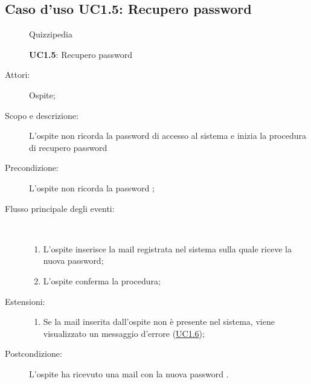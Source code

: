 \subsection{Caso d'uso UC1.5: Recupero password}
\begin{figure}[H]
	\centering
	\begin{resizedtikzpicture}{\textwidth}
		\begin{umlsystem}[x=0, fill=lightgray!20]{Quizzipedia}
		\end{umlsystem}
	\end{resizedtikzpicture}
	\caption{\textbf{UC1.5}: Recupero password}
	\label{UC1.5}
\end{figure}
\begin{description}
	\item[Attori:] Ospite;
	\item[Scopo e descrizione:] L'ospite non ricorda la password di accesso al sistema e inizia la procedura di recupero password
	\item[Precondizione:] L'ospite non ricorda la password
	;
	
	\item[Flusso principale degli eventi:] \ 
	\begin{enumerate}
		\item L'ospite inserisce la mail registrata nel sistema sulla quale riceve la nuova password;
		\item L'ospite conferma la procedura;
		
	\end{enumerate}
	\item[Estensioni:]
	\begin{enumerate}
		\item Se la mail inserita dall'ospite non è presente nel sistema, viene visualizzato un messaggio d'errore (\hyperlink{UC1.6}{UC1.6});
		
	\end{enumerate}
	\item[Postcondizione:] L'ospite ha ricevuto una mail con la nuova password
	.
\end{description}
\hypertarget{UC1.6}{}
